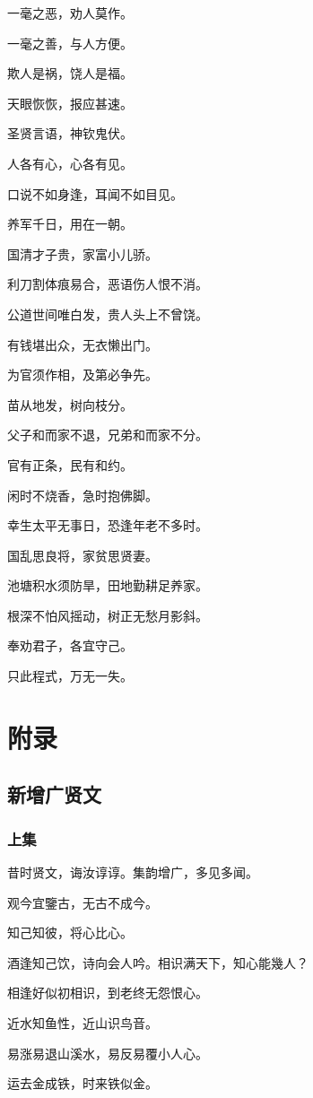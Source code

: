 \documentclass[12pt,oneside]{book}
\begin{document}
一毫之恶，劝人莫作。

一毫之善，与人方便。

欺人是祸，饶人是福。

天眼恢恢，报应甚速。

圣贤言语，神钦鬼伏。

人各有心，心各有见。

口说不如身逢，耳闻不如目见。

养军千日，用在一朝。

国清才子贵，家富小儿骄。

利刀割体痕易合，恶语伤人恨不消。

公道世间唯白发，贵人头上不曾饶。

有钱堪出众，无衣懒出门。

为官须作相，及第必争先。

苗从地发，树向枝分。

父子和而家不退，兄弟和而家不分。

官有正条，民有和约。

闲时不烧香，急时抱佛脚。

幸生太平无事日，恐逢年老不多时。

国乱思良将，家贫思贤妻。

池塘积水须防旱，田地勤耕足养家。

根深不怕风摇动，树正无愁月影斜。

奉劝君子，各宜守己。

只此程式，万无一失。  
  
\part{附录}
\chapter{新增广贤文}
\section{上集}
昔时贤文，诲汝谆谆。集韵增广，多见多闻。

观今宜鑒古，无古不成今。

知己知彼，将心比心。

酒逢知己饮，诗向会人吟。相识满天下，知心能幾人？

相逢好似初相识，到老终无怨恨心。

近水知鱼性，近山识鸟音。

易涨易退山溪水，易反易覆小人心。

运去金成铁，时来铁似金。
\end{document}
